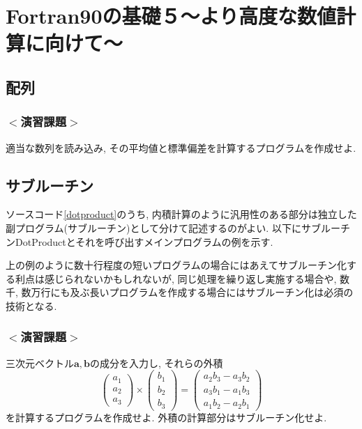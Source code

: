 \chapter{Fortran90の基礎５〜より高度な数値計算に向けて〜}
\section{配列}




\subsection*{$<$演習課題$>$}
適当な数列を読み込み, その平均値と標準偏差を計算するプログラムを作成せよ.

\section{サブルーチン}
ソースコード\ref{dotproduct}のうち,
内積計算のように汎用性のある部分は独立した副プログラム(サブルーチン)として分けて記述するのがよい.
以下にサブルーチンDotProductとそれを呼び出すメインプログラムの例を示す.

上の例のように数十行程度の短いプログラムの場合にはあえてサブルーチン化する利点は感じられないかもしれないが,
同じ処理を繰り返し実施する場合や,
数千, 数万行にも及ぶ長いプログラムを作成する場合にはサブルーチン化は必須の技術となる.


\subsection*{$<$演習課題$>$}
三次元ベクトル$\bm{a}, \bm{b}$の成分を入力し, それらの外積
\begin{equation}
\begin{pmatrix}
a_1 \\ a_2 \\ a_3
\end{pmatrix}
\times
\begin{pmatrix}
b_1 \\ b_2 \\ b_3
\end{pmatrix}
=
\begin{pmatrix}
a_2b_3-a_3b_2 \\ a_3b_1-a_1b_3 \\ a_1b_2-a_2b_1
\end{pmatrix}
\end{equation}
を計算するプログラムを作成せよ.
外積の計算部分はサブルーチン化せよ.
%

